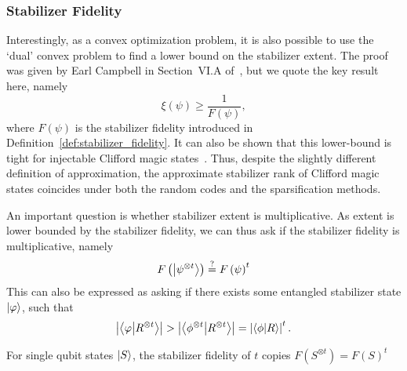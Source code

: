 \subsubsection{Stabilizer Fidelity}
Interestingly, as a convex optimization problem, it is also possible to use the `dual' convex problem to find a lower bound on the stabilizer extent. The proof was given by Earl Campbell in Section~VI.A of~\cite{Bravyi2018}, but we quote the key result here, namely
\begin{equation}
\xi\left(\psi\right) \geq \frac{1}{F\left(\psi\right)},
\label{eq:extent_fidelity_bound}
\end{equation}
where $F\left(\psi\right)$ is the stabilizer fidelity introduced in Definition~\ref{def:stabilizer_fidelity}. It can also be shown that this lower-bound is tight for injectable Clifford magic states~\cite{Bravyi2018}. Thus, despite the slightly different definition of approximation, the approximate stabilizer rank of Clifford magic states coincides under both the random codes and the sparsification methods.\par
An important question is whether stabilizer extent is multiplicative. As extent is lower bounded by the stabilizer fidelity, we can thus ask if the stabilizer fidelity is multiplicative, namely
\[F\left(\ket{\psi^{\otimes t}}\right) \overset{?}{=} F\left(\psi\right)^{t}\]
This can also be expressed as asking if there exists some entangled stabilizer state $\ket{\varphi}$, such that
\[\left|\braket{\varphi}{R^{\otimes t}}\right|>\left|\braket{\phi^{\otimes t}}{R^{\otimes t}}\right|=\left|\braket{\phi}{R}\right|^{t}.\]
\begin{lem}
For single qubit states $\ket{S}$, the stabilizer fidelity  of $t$ copies $F\left(S^{\otimes t}\right)=F\left(S\right)^{t}$
\label{lem:single_qubit_multiplicative}
\end{lem}
